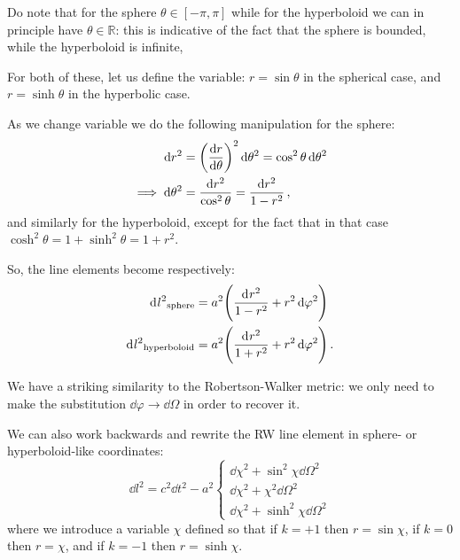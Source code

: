 \documentclass[main.tex]{subfiles}
\begin{document}
Do note that for the sphere \(\theta  \in [- \pi, \pi ]\) while for the hyperboloid we can in principle have \(\theta \in \mathbb{R}\): this is indicative of the fact that the sphere is bounded, while the hyperboloid is infinite, 

For both of these, let us define the variable: \(r = \sin\theta \) in the spherical case, and \(r = \sinh \theta \)  in the hyperbolic case.

As we change variable we do the following manipulation for the sphere: 
%
\begin{subequations}
\begin{align}
\dd{r^2} &= \qty(\dv{r}{\theta })^2 \dd{\theta^2} = \cos^2\theta \dd{\theta^2}  \\
\implies \dd{\theta^2} &= \frac{\dd{r^2}}{\cos^2\theta } = \frac{\dd{r^2}}{1 - r^2}
\,,
\end{align}
\end{subequations}
%
and similarly for the hyperboloid, except for the fact that in that case \(\cosh^2 \theta  = 1 + \sinh^2\theta = 1+r^2 \).

So, the line elements become respectively:
\begin{subequations}
\begin{align}
    \dd[]{l^2}_{\text{sphere}} &= a^2 \qty(\frac{\dd[]{r^2}}{1 - r^2}  + r^2 \dd{\varphi^2}  )\\
    \dd[]{l^2}_{\text{hyperboloid}} &= a^2 \qty(\frac{\dd[]{r^2}}{1 + r^2} + r^2 \dd{\varphi^2}  )\,.
\end{align}
\end{subequations}

We have a striking similarity to the Robertson-Walker metric: we only need to make the substitution \(\dd{\varphi } \rightarrow \dd{\Omega }\) in order to recover it.

We can also work backwards and rewrite the RW line element in sphere- or hyperboloid-like coordinates:
\begin{equation}
  \dd{l^2} = c^2 \dd{t^2} - a^2 \begin{cases}
      \dd{\chi^2} + \sin^2 \chi \dd{\Omega^2} \\
      \dd{\chi^2} + \chi^2\dd{\Omega^2} \\
      \dd{\chi^2} + \sinh^2 \chi \dd{\Omega^2}
\end{cases}
\end{equation}
%
where we introduce a variable \(\chi \) defined so that if \(k = +1\) then \(r = \sin \chi\), if \(k=0\)  then \(r=\chi\), and if \(k = -1\) then \(r = \sinh \chi\).
\end{document}
